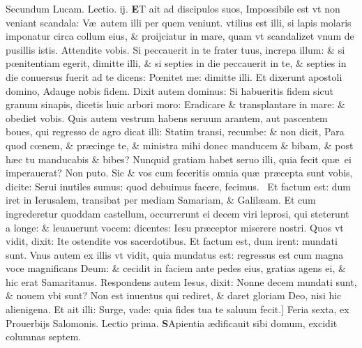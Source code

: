 \documentclass[a5paper,10pt]{book}
\def\leftmarginnote{%
	\lrmarginnote{\hskip -\marginparsep \hskip -6.5em}}
\def\rightmarginnote{%
	\lrmarginnote{\hskip\columnwidth \hskip -1em}}
\def\ae{æ}
\def\oe{œ}
\begin{document}
\begin{multicols*}{2}
\newline \color{red} Secundum Lucam. \hfill Lectio. ij. \color{black}
\vspace{-.25em}
\lettrine[lines=2]{\bfseries \color{red} E}{}T\leftmarginnote{\begin{flushright}c. 17.\end{flushright}} ait ad discipulos suos, Impossibile est vt non veniant scandala: V\ae \ autem illi per quem veniunt.
vtilius est illi, si lapis molaris imponatur circa collum eius, \& proijciatur in mare, quam vt scandalizet vnum de pusillis istis.
Attendite vobis. Si peccauerit in te frater tuus, increpa illum: \& si p\oe nitentiam egerit, dimitte illi, \& si septies in die peccauerit in te, \& septies in die conuersus fuerit ad te dicens: P\oe nitet me: dimitte illi. Et dixerunt apostoli domino, Adauge nobis fidem.
Dixit autem dominus: Si habueritis fidem sicut granum sinapis, dicetis huic arbori moro: Eradicare \& transplantare in mare: \& obediet vobis.
Quis autem vestrum habens seruum arantem, aut pascentem boues, qui regresso de agro dicat illi: Statim transi, recumbe: \& non dicit, Para quod c\oe nem, \& pr\ae cinge te, \& ministra mihi donec manducem \& bibam, \& post h\ae c tu manducabis \& bibes?
Nunquid gratiam habet seruo illi, quia fecit qu\ae \ ei imperauerat?
Non puto. Sic \& vos cum feceritis omnia qu\ae \ pr\ae cepta sunt vobis, dicite: Serui inutiles sumus: quod debuimus facere, fecimus. \textdagger \ 
Et\rightmarginnote{B} factum est: dum iret in Ierusalem, transibat per mediam Samariam, \& Galil\ae am.
Et cum ingrederetur quoddam castellum, occurrerunt ei decem viri leprosi, qui steterunt a longe: \& leuauerunt vocem: dicentes: Iesu pr\ae ceptor miserere nostri.
Quos vt vidit, dixit: Ite ostendite vos sacerdotibus. Et factum est, dum irent: mundati sunt. Vnus autem ex illis vt vidit, quia mundatus est: regressus est cum magna voce magnificans Deum: \& cecidit in faciem ante pedes eius, gratias agens ei, \& hic erat Samaritanus.
Respondens autem Iesus, dixit: Nonne decem
mundati sunt, \& nouem vbi sunt?
Non est inuentus qui rediret, \& daret gloriam Deo, nisi hic alienigena. Et ait illi: Surge, vade: quia fides tua te saluum fecit.]
\newline \textswab{C} \color{red} \hypertarget{FRI-SECVNDA-POST-ADV}{Feria sexta,} ex Prouerbijs Salomonis. \hfill Lectio prima. \color{black}
\bookmark[dest=FRI-SECVNDA-POST-ADV]{FERIA SEXTA}
\vspace{-1.25em}
\lettrine[lines=2]{\bfseries S}{}Apientia\rightmarginnote{ca. 9.} \ae dificauit sibi domum, excidit columnas septem.

\end{multicols*}
\end{document}
